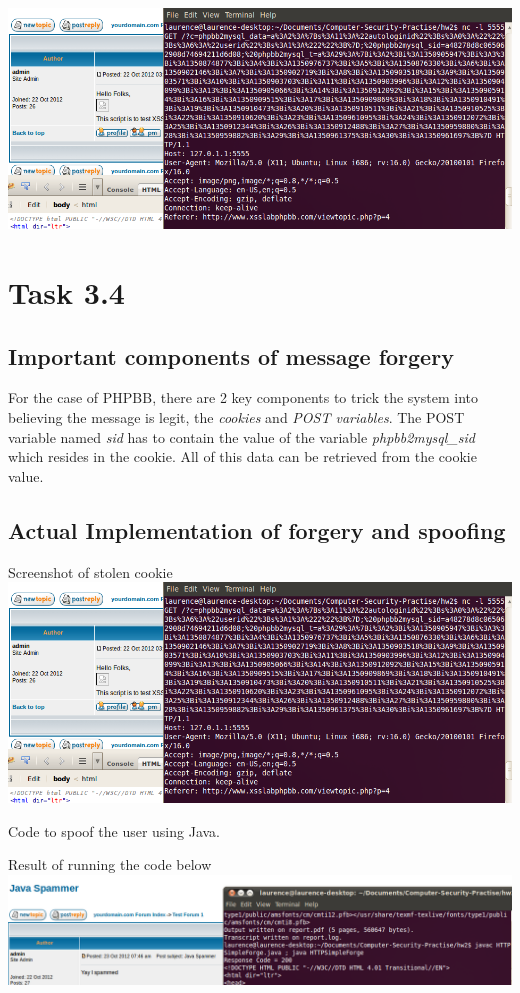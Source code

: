 \documentclass[12pt]{article}
\begin{document}
\includegraphics[width=160mm]{task33.png}
\pagebreak


\section{Task 3.4}
\subsection{Important components of message forgery}
For the case of PHPBB, there are 2 key components to trick the system into believing the message is legit, the \emph{cookies} and \emph{POST variables}. The POST variable named \emph{sid} has to contain the value of the variable \emph{phpbb2mysql\_sid} which resides in the cookie. All of this data can be retrieved from the cookie value.

\subsection{Actual Implementation of forgery and spoofing}
Screenshot of stolen cookie\\
\includegraphics[width=160mm]{task33.png}

Code to spoof the user using Java.
\lstset{caption=HTTPSimpleForge.java, frame=single}


Result of running the code below\\
\includegraphics[width=160mm]{task34.png}
\pagebreak
\end{document}
